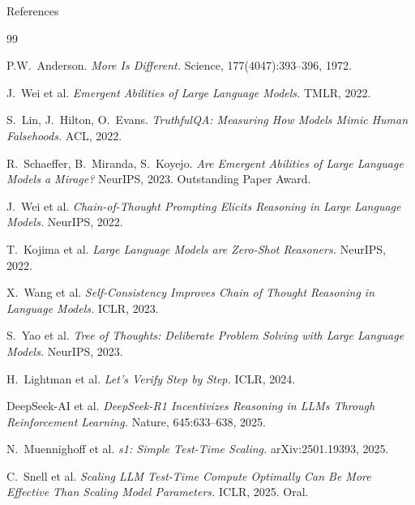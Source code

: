 \documentclass[aspectratio=169, 12pt, xcolor=dvipsnames]{beamer}
\begin{document}
\begin{frame}[allowframebreaks]{References}
  \footnotesize
  \begin{thebibliography}{99}

    P.W.\ Anderson.
    \newblock \emph{More Is Different.}
    \newblock Science, 177(4047):393--396, 1972.

    J.\ Wei et al.
    \newblock \emph{Emergent Abilities of Large Language Models.}
    \newblock TMLR, 2022.

    S.\ Lin, J.\ Hilton, O.\ Evans.
    \newblock \emph{TruthfulQA: Measuring How Models Mimic Human Falsehoods.}
    \newblock ACL, 2022.

    R.\ Schaeffer, B.\ Miranda, S.\ Koyejo.
    \newblock \emph{Are Emergent Abilities of Large Language Models a Mirage?}
    \newblock NeurIPS, 2023. Outstanding Paper Award.

    J.\ Wei et al.
    \newblock \emph{Chain-of-Thought Prompting Elicits Reasoning in Large Language Models.}
    \newblock NeurIPS, 2022.

    T.\ Kojima et al.
    \newblock \emph{Large Language Models are Zero-Shot Reasoners.}
    \newblock NeurIPS, 2022.

    X.\ Wang et al.
    \newblock \emph{Self-Consistency Improves Chain of Thought Reasoning in Language Models.}
    \newblock ICLR, 2023.

    S.\ Yao et al.
    \newblock \emph{Tree of Thoughts: Deliberate Problem Solving with Large Language Models.}
    \newblock NeurIPS, 2023.

    H.\ Lightman et al.
    \newblock \emph{Let's Verify Step by Step.}
    \newblock ICLR, 2024.

    DeepSeek-AI et al.
    \newblock \emph{DeepSeek-R1 Incentivizes Reasoning in LLMs Through Reinforcement Learning.}
    \newblock Nature, 645:633--638, 2025.

    N.\ Muennighoff et al.
    \newblock \emph{s1: Simple Test-Time Scaling.}
    \newblock arXiv:2501.19393, 2025.

    C.\ Snell et al.
    \newblock \emph{Scaling LLM Test-Time Compute Optimally Can Be More Effective Than Scaling Model Parameters.}
    \newblock ICLR, 2025. Oral.

  \end{thebibliography}
\end{frame}
\end{document}
